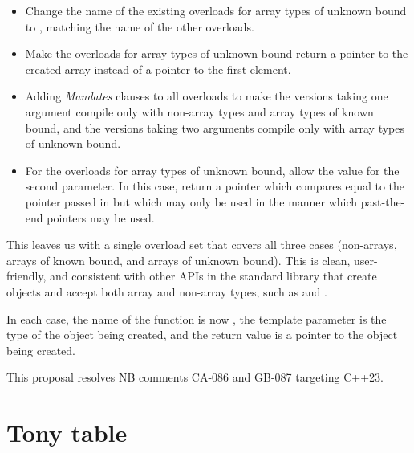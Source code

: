 \begin{itemize}
\item Change the name of the existing \mbox{} overloads for array types of unknown bound to \mbox{}, matching the name of the other overloads.
\item Make the overloads for array types of unknown bound return a pointer to the created array instead of a pointer to the first element.
\item Adding \emph{Mandates} clauses to all overloads to make the versions taking one argument compile only with non-array types and array types of known bound, and the versions taking two arguments compile only with array types of unknown bound.
\item For the overloads for array types of unknown bound, allow the value  for the second parameter. In this case, return a pointer which compares equal to the pointer passed in but which may only be used in the manner which past-the-end pointers may be used.
\end{itemize}

This leaves us with a single overload set that covers all three cases (non-arrays, arrays of known bound, and arrays of unknown bound). This is clean, user-friendly, and consistent with other APIs in the standard library that create objects and accept both array and non-array types, such as  and .

In each case, the name of the function is now , the template parameter is the type of the object being created, and the return value is a pointer to the object being created.

This proposal resolves NB comments CA-086 and GB-087 targeting C++23.

\section{Tony table}

